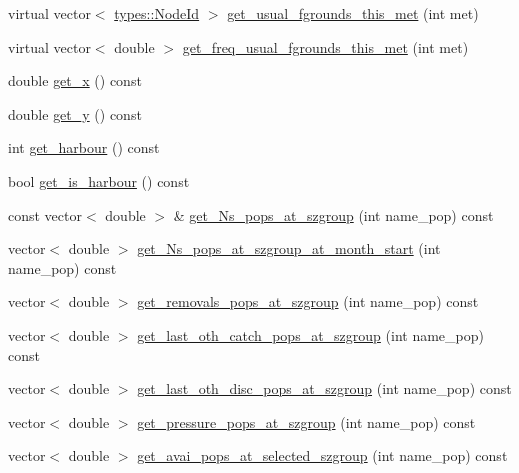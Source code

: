 \begin{DoxyCompactItemize}
\item 
virtual vector$<$ \mbox{\hyperlink{classtypes_1_1_node_id}{types\+::\+Node\+Id}} $>$ \mbox{\hyperlink{class_node_a604f051bec95c8ba70e5d5461c9599a3}{get\+\_\+usual\+\_\+fgrounds\+\_\+this\+\_\+met}} (int met)
\item 
virtual vector$<$ double $>$ \mbox{\hyperlink{class_node_ab317835e72ccdd4c508be8b1667bc56f}{get\+\_\+freq\+\_\+usual\+\_\+fgrounds\+\_\+this\+\_\+met}} (int met)
\item 
double \mbox{\hyperlink{class_node_afb46d566c3b3f50eb9452ae2e0164c3a}{get\+\_\+x}} () const
\item 
double \mbox{\hyperlink{class_node_a3f0d46513fb8482a37818bb80f1285f1}{get\+\_\+y}} () const
\item 
int \mbox{\hyperlink{class_node_adfebff564c1983113fb8e32f876c4667}{get\+\_\+harbour}} () const
\item 
bool \mbox{\hyperlink{class_node_a357eb9fa8e39a41a3a283ac61e96a567}{get\+\_\+is\+\_\+harbour}} () const
\item 
const vector$<$ double $>$ \& \mbox{\hyperlink{class_node_a96a15c1e53a7bdf076b8088bf1340005}{get\+\_\+\+Ns\+\_\+pops\+\_\+at\+\_\+szgroup}} (int name\+\_\+pop) const
\item 
vector$<$ double $>$ \mbox{\hyperlink{class_node_a412618aef40c7700273e7a7017296bde}{get\+\_\+\+Ns\+\_\+pops\+\_\+at\+\_\+szgroup\+\_\+at\+\_\+month\+\_\+start}} (int name\+\_\+pop) const
\item 
vector$<$ double $>$ \mbox{\hyperlink{class_node_a77efffa3c257251bd58293cd24a180c2}{get\+\_\+removals\+\_\+pops\+\_\+at\+\_\+szgroup}} (int name\+\_\+pop) const
\item 
vector$<$ double $>$ \mbox{\hyperlink{class_node_aa5634dc21c21b32ddfb2ac6340d3fbbd}{get\+\_\+last\+\_\+oth\+\_\+catch\+\_\+pops\+\_\+at\+\_\+szgroup}} (int name\+\_\+pop) const
\item 
vector$<$ double $>$ \mbox{\hyperlink{class_node_a364dfa5f71746f22e0493586159637a9}{get\+\_\+last\+\_\+oth\+\_\+disc\+\_\+pops\+\_\+at\+\_\+szgroup}} (int name\+\_\+pop) const
\item 
vector$<$ double $>$ \mbox{\hyperlink{class_node_a92795b1420da105e9a3e7fb93676f4f4}{get\+\_\+pressure\+\_\+pops\+\_\+at\+\_\+szgroup}} (int name\+\_\+pop) const
\item 
vector$<$ double $>$ \mbox{\hyperlink{class_node_a3a644221518403e5b26c935b847b6a4c}{get\+\_\+avai\+\_\+pops\+\_\+at\+\_\+selected\+\_\+szgroup}} (int name\+\_\+pop) const
\item 

\end{DoxyCompactItemize}
